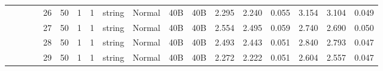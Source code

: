 \begin{landscape}
\begin{table}[]
{\begin{tabular}{@{}ccccllllllllllllll@{}}
                                                                                   &                              &                                &                                                                                                          & 26                                                    & 50                                       & 1                                          & 1                                 & string                           & Normal                             & 40B                                           & 40B                                             & 2.295                   & 2.240    & 0.055                        & 3.154                   & 3.104    & 0.049                        \\
                                                                                   &                              &                                &                                                                                                          & 27                                                    & 50                                       & 1                                          & 1                                 & string                           & Normal                             & 40B                                           & 40B                                             & 2.554                   & 2.495    & 0.059                        & 2.740                   & 2.690    & 0.050                        \\
                                                                                   &                              &                                &                                                                                                          & 28                                                    & 50                                       & 1                                          & 1                                 & string                           & Normal                             & 40B                                           & 40B                                             & 2.493                   & 2.443    & 0.051                        & 2.840                   & 2.793    & 0.047                        \\
                                                                                   &                              &                                &                                                                                                          & 29                                                    & 50                                       & 1                                          & 1                                 & string                           & Normal                             & 40B                                           & 40B                                             & 2.272                   & 2.222    & 0.051                        & 2.604                   & 2.557    & 0.047                        \\

\end{tabular}}
\end{table}
\end{landscape}
